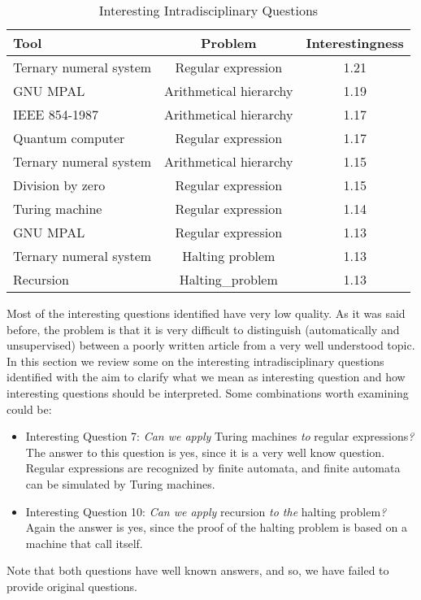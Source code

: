 \begin{table*}
\begin{centering}
\begin{tabular}{|l|c|c|}
\hline 
{Tool} & Problem & Interestingness\tabularnewline
\hline 
\hline 
Ternary numeral system & Regular expression & 1.21\tabularnewline
\hline 
{GNU MPAL} & Arithmetical hierarchy & 1.19\tabularnewline
\hline 
IEEE 854-1987 & Arithmetical hierarchy & 1.17\tabularnewline
\hline 
Quantum computer & Regular expression & 1.17\tabularnewline
\hline 
Ternary numeral system & Arithmetical hierarchy & 1.15\tabularnewline
\hline 
Division by zero & Regular expression & 1.15\tabularnewline
\hline 
Turing machine & Regular expression & 1.14\tabularnewline
\hline 
GNU MPAL & Regular expression & 1.13\tabularnewline
\hline 
Ternary numeral system & Halting problem & 1.13\tabularnewline
\hline 
Recursion & Halting\_problem & 1.13\tabularnewline
\hline 
\end{tabular}
\par\end{centering}

\caption{\label{tab:Interesting-Intradisciplinary-Questions}Interesting Intradisciplinary
Questions}
\end{table*}

Most of the interesting questions identified have very low quality.
As it was said before, the problem is that it is very difficult to
distinguish (automatically and unsupervised) between a poorly written
article from a very well understood topic. In this section we review
some on the interesting intradisciplinary questions identified with
the aim to clarify what we mean as interesting question and how interesting
questions should be interpreted. Some combinations worth examining
could be:
\begin{itemize}
\item Interesting Question 7: \emph{Can we apply }Turing machines\emph{
to }regular expressions\emph{?} The answer to this question is yes,
since it is a very well know question. Regular expressions are recognized
by finite automata, and finite automata can be simulated by Turing
machines.
\item Interesting Question 10: \emph{Can we apply }recursion\emph{ to the
}halting problem\emph{?} Again the answer is yes, since the proof
of the halting problem is based on a machine that call itself.
\end{itemize}
Note that both questions have well known answers, and so, we have
failed to provide original questions.

